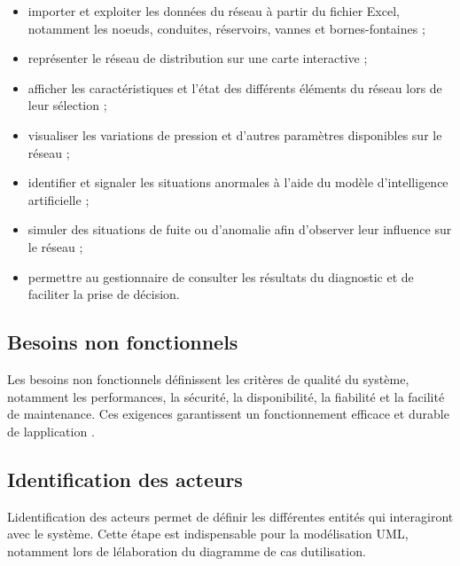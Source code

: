 \begin{itemize}
	\item
	importer et exploiter les données du réseau à partir du fichier
	Excel, notamment les noeuds, conduites, réservoirs, vannes et
	bornes-fontaines ;
	
	\item
	représenter le réseau de distribution sur une carte interactive ;
	
	\item
	afficher les caractéristiques et l'état des différents éléments
	du réseau lors de leur sélection ;
	
	\item
	visualiser les variations de pression et d'autres paramètres
	disponibles sur le réseau ;
	
	\item
	identifier et signaler les situations anormales à l'aide du modèle
	d'intelligence artificielle ;
	
	\item
	simuler des situations de fuite ou d'anomalie afin d'observer leur
	influence sur le réseau ;
	
	\item
	permettre au gestionnaire de consulter les résultats du diagnostic
	et de faciliter la prise de décision.
	
\end{itemize}

\subsection{Besoins non fonctionnels}\label{besoins-non-fonctionnels}

Les besoins non fonctionnels définissent les critères de qualité du
système, notamment les performances, la sécurité, la disponibilité, la
fiabilité et la facilité de maintenance. Ces exigences garantissent un
fonctionnement efficace et durable de l\textquotesingle application
\cite{ref123}.

\subsection{Identification des acteurs}\label{identification-des-acteurs}

L\textquotesingle identification des acteurs permet de définir les
différentes entités qui interagiront avec le système. Cette étape est
indispensable pour la modélisation UML, notamment lors de
l\textquotesingle élaboration du diagramme de cas
d\textquotesingle utilisation.

